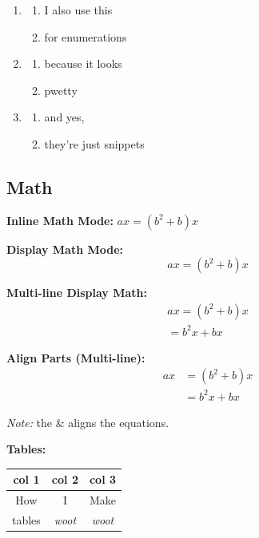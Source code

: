 \documentclass[letter]{article}
\theoremstyle{definition}
\begin{document}
\begin{enumerate}[nosep]

  \item \begin{enumerate}[nosep,label=(\alph*)]
      \item I also use this
      \item for enumerations
    \end{enumerate}

  \item \begin{enumerate}[nosep,label=(\alph*)]
    \item because it looks
    \item pwetty
  \end{enumerate}

  \item \begin{enumerate}[nosep,label=(\alph*)]
    \item and yes,
    \item they're just snippets 
  \end{enumerate}
\end{enumerate}

\subsection*{Math}

\textbf{Inline Math Mode:} $ax = (b^2 + b)x$


\textbf{Display Math Mode:}
$$
ax = (b^2 + b)x
$$

\textbf{Multi-line Display Math:}
\begin{gather*}
  ax = (b^2 + b)x \\
     = b^2x + bx
\end{gather*}

\textbf{Align Parts (Multi-line):}
\begin{align*}
  ax &= (b^2 + b)x \\
     &= b^2x + bx
\end{align*}

\textit{Note:} the \& aligns the equations.

\textbf{Tables:}

\begin{table}[H]
  \center
  \begin{tabular}{|c|c|c|}
    \hline
    \textbf{col 1} & \textbf{col 2} & \textbf{col 3} \\ \hline\hline
    How & I & Make \\ \hline
    tables & \textit{woot} & \textit{woot} \\ \hline
  \end{tabular}
\end{table}
\end{document}
